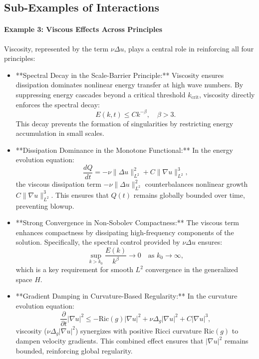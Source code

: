 \documentclass[12pt]{article}
\theoremstyle{definition}
\begin{document}
\subsection{Sub-Examples of Interactions}

\paragraph{Example 3: Viscous Effects Across Principles}
Viscosity, represented by the term $\nu \Delta u$, plays a central role in reinforcing all four principles:
\begin{itemize}
    \item **Spectral Decay in the Scale-Barrier Principle:**
    Viscosity ensures dissipation dominates nonlinear energy transfer at high wave numbers. By suppressing energy cascades beyond a critical threshold $k_{\text{crit}}$, viscosity directly enforces the spectral decay:
    \begin{equation}
    E(k, t) \leq C k^{-\beta}, \quad \beta > 3.
    \end{equation}
    This decay prevents the formation of singularities by restricting energy accumulation in small scales.

    \item **Dissipation Dominance in the Monotone Functional:**
    In the energy evolution equation:
    \begin{equation}
    \frac{dQ}{dt} = -\nu \|\Delta u\|_{L^2}^2 + C \|\nabla u\|_{L^2}^3,
    \end{equation}
    the viscous dissipation term $-\nu \|\Delta u\|_{L^2}^2$ counterbalances nonlinear growth $C \|\nabla u\|_{L^2}^3$. This ensures that $Q(t)$ remains globally bounded over time, preventing blowup.

    \item **Strong Convergence in Non-Sobolev Compactness:**
    The viscous term enhances compactness by dissipating high-frequency components of the solution. Specifically, the spectral control provided by $\nu \Delta u$ ensures:
    \begin{equation}
    \sup_{k > k_0} \frac{E(k)}{k^\beta} \to 0 \quad \text{as } k_0 \to \infty,
    \end{equation}
    which is a key requirement for smooth $L^2$ convergence in the generalized space $H$.

    \item **Gradient Damping in Curvature-Based Regularity:**
    In the curvature evolution equation:
    \begin{equation}
    \frac{\partial}{\partial t} |\nabla u|^2 \leq -\text{Ric}(g)|\nabla u|^2 + \nu \Delta_g |\nabla u|^2 + C|\nabla u|^3,
    \end{equation}
    viscosity ($\nu \Delta_g |\nabla u|^2$) synergizes with positive Ricci curvature $\text{Ric}(g)$ to dampen velocity gradients. This combined effect ensures that $|\nabla u|^2$ remains bounded, reinforcing global regularity.
\end{itemize}
\end{document}
